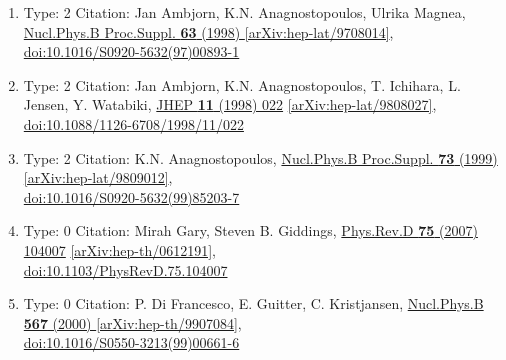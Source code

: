 \documentclass[a4paper,10pt]{article}
\begin{document}
\begin{enumerate}
\begin{enumerate}
  \item Type: 2 Citation: Jan Ambjorn, K.N. Anagnostopoulos, Ulrika Magnea, \href{https://www.doi.org/10.1016/S0920-5632(97)00893-1}{Nucl.Phys.B Proc.Suppl. {\bf 63} (1998) }  \href{https://arxiv.org/abs/hep-lat/9708014}{[arXiv:hep-lat/9708014]},\\\href{https://www.doi.org/10.1016/S0920-5632(97)00893-1}{doi:10.1016/S0920-5632(97)00893-1}
  \item Type: 2 Citation: Jan Ambjorn, K.N. Anagnostopoulos, T. Ichihara, L. Jensen, Y. Watabiki, \href{https://www.doi.org/10.1088/1126-6708/1998/11/022}{JHEP {\bf 11} (1998) 022}  \href{https://arxiv.org/abs/hep-lat/9808027}{[arXiv:hep-lat/9808027]},\\\href{https://www.doi.org/10.1088/1126-6708/1998/11/022}{doi:10.1088/1126-6708/1998/11/022}
  \item Type: 2 Citation: K.N. Anagnostopoulos, \href{https://www.doi.org/10.1016/S0920-5632(99)85203-7}{Nucl.Phys.B Proc.Suppl. {\bf 73} (1999) }  \href{https://arxiv.org/abs/hep-lat/9809012}{[arXiv:hep-lat/9809012]},\\\href{https://www.doi.org/10.1016/S0920-5632(99)85203-7}{doi:10.1016/S0920-5632(99)85203-7}
  \item Type: 0 Citation: Mirah Gary, Steven B. Giddings, \href{https://www.doi.org/10.1103/PhysRevD.75.104007}{Phys.Rev.D {\bf 75} (2007) 104007}  \href{https://arxiv.org/abs/hep-th/0612191}{[arXiv:hep-th/0612191]},\\\href{https://www.doi.org/10.1103/PhysRevD.75.104007}{doi:10.1103/PhysRevD.75.104007}
  \item Type: 0 Citation: P. Di Francesco, E. Guitter, C. Kristjansen, \href{https://www.doi.org/10.1016/S0550-3213(99)00661-6}{Nucl.Phys.B {\bf 567} (2000) }  \href{https://arxiv.org/abs/hep-th/9907084}{[arXiv:hep-th/9907084]},\\\href{https://www.doi.org/10.1016/S0550-3213(99)00661-6}{doi:10.1016/S0550-3213(99)00661-6}

\end{enumerate}
\end{enumerate}
\end{document}
